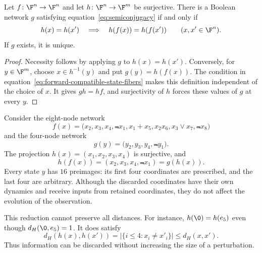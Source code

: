 \begin{samepage}
\begin{proposition}\label{prop:semiconjugacy-fibers}
    Let $f\colon\F^n\to\F^n$ and let $h\colon\F^n\to\F^m$ be surjective. There is a Boolean network $g$ satisfying equation~\eqref{eq:semiconjugacy} if and only if
    \begin{equation}\label{eq:forward-compatible-state-fibers}
        h(x)=h(x')\quad\Longrightarrow\quad h(f(x))=h(f(x'))
        \qquad(x,x'\in\F^n).
    \end{equation}
    If $g$ exists, it is unique.
\end{proposition}
\end{samepage}

\begin{proof}
    Necessity follows by applying $g$ to $h(x)=h(x')$. Conversely, for $y\in\F^m$, choose $x\in h^{-1}(y)$ and put $g(y)=h(f(x))$. The condition in equation~\eqref{eq:forward-compatible-state-fibers} makes this definition independent of the choice of $x$. It gives $gh=hf$, and surjectivity of $h$ forces these values of $g$ at every $y$.
\end{proof}

\begin{example}\label{ex:semiconjugacy-projection}
    Consider the eight-node network
    \[
        f(x)=\bigl(x_2,x_3,x_4,\Not{x}_1,
                   x_1+x_5,x_2x_6,x_3\vee x_7,\Not{x}_8\bigr)
    \]
    and the four-node network
    \[
        g(y)=\bigl(y_2,y_3,y_4,\Not{y}_1\bigr).
    \]
    The projection $h(x)=(x_1,x_2,x_3,x_4)$ is surjective, and
    \[
        h(f(x))=(x_2,x_3,x_4,\Not{x}_1)=g(h(x)).
    \]
    Every state $y$ has $16$ preimages: its first four coordinates are prescribed, and the last four are arbitrary. Although the discarded coordinates have their own dynamics and receive inputs from retained coordinates, they do not affect the evolution of the observation.

    This reduction cannot preserve all distances. For instance, $h(\0)=h(e_5)$ even though $d_H(\0,e_5)=1$. It does satisfy
    \[
        d_H(h(x),h(x'))
        =\bigl|\{i\le4:x_i\ne x'_i\}\bigr|
        \le d_H(x,x').
    \]
    Thus information can be discarded without increasing the size of a perturbation.
\end{example}

